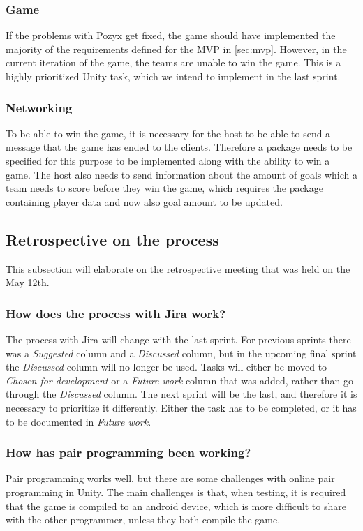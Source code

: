 \subsubsection{Game}
If the problems with Pozyx get fixed, the game should have implemented the majority of the requirements defined for the MVP in \autoref{sec:mvp}.
However, in the current iteration of the game, the teams are unable to win the game.
This is a highly prioritized Unity task, which we intend to implement in the last sprint.

\subsubsection{Networking}
To be able to win the game, it is necessary for the host to be able to send a message that the game has ended to the clients.
Therefore a package needs to be specified for this purpose to be implemented along with the ability to win a game.
The host also needs to send information about the amount of goals which a team needs to score before they win the game, which requires the package containing player data and now also goal amount to be updated.

\subsection{Retrospective on the process}
This subsection will elaborate on the retrospective meeting that was held on the May 12th.

\subsubsection*{How does the process with Jira work?}
The process with Jira will change with the last sprint.
For previous sprints there was a \textit{Suggested} column and a \textit{Discussed} column, but in the upcoming final sprint the \textit{Discussed} column will no longer be used.
Tasks will either be moved to \textit{Chosen for development} or a \textit{Future work} column that was added, rather than go through the \textit{Discussed} column.
The next sprint will be the last, and therefore it is necessary to prioritize it differently.
Either the task has to be completed, or it has to be documented in \textit{Future work}.

\subsubsection*{How has pair programming been working?}
Pair programming works well, but there are some challenges with online pair programming in Unity.
The main challenges is that, when testing, it is required that the game is compiled to an android device, which is more difficult to share with the other programmer, unless they both compile the game.

